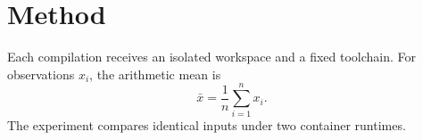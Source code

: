 \section{Method}\label{sec:method}
Each compilation receives an isolated workspace and a fixed toolchain.
For observations $x_i$, the arithmetic mean is
\begin{equation}\bar{x}=\frac{1}{n}\sum_{i=1}^{n}x_i.\end{equation}
The experiment compares identical inputs under two container runtimes.
